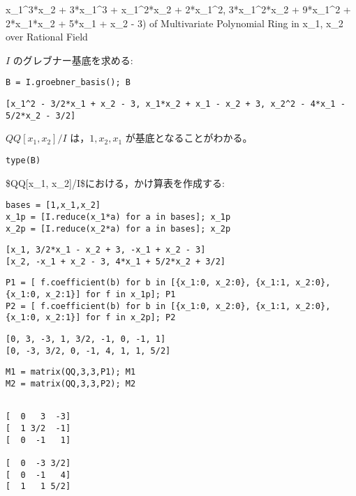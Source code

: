 \documentclass[dvipdfmx,11pat]{jarticle}
\begin{document}
x\_1\^{}3*x\_2 + 3*x\_1\^{}3 + x\_1\^{}2*x\_2 + 2*x\_1\^{}2,
3*x\_1\^{}2*x\_2 + 9*x\_1\^{}2 + 2*x\_1*x\_2 + 5*x\_1 + x\_2 - 3)
of Multivariate Polynomial Ring in x\_1, x\_2 over Rational Field

\(I\)  のグレブナー基底を求める:

\begin{verbatim}
B = I.groebner_basis(); B
\end{verbatim}

\label{org82f874b}
\begin{verbatim}
[x_1^2 - 3/2*x_1 + x_2 - 3, x_1*x_2 + x_1 - x_2 + 3, x_2^2 - 4*x_1 - 5/2*x_2 - 3/2]
\end{verbatim}


\(QQ[x_1, x_2]/I\) は，\(1, x_2, x_1\) が基底となることがわかる。

\begin{verbatim}
type(B)
\end{verbatim}

\$QQ[x\_1, x\_2]/I\$における，かけ算表を作成する:

\begin{verbatim}
bases = [1,x_1,x_2]
x_1p = [I.reduce(x_1*a) for a in bases]; x_1p
x_2p = [I.reduce(x_2*a) for a in bases]; x_2p

\end{verbatim}

\label{org6e818e9}
\begin{verbatim}
[x_1, 3/2*x_1 - x_2 + 3, -x_1 + x_2 - 3]
[x_2, -x_1 + x_2 - 3, 4*x_1 + 5/2*x_2 + 3/2]
\end{verbatim}


\begin{verbatim}
P1 = [ f.coefficient(b) for b in [{x_1:0, x_2:0}, {x_1:1, x_2:0}, {x_1:0, x_2:1}] for f in x_1p]; P1
P2 = [ f.coefficient(b) for b in [{x_1:0, x_2:0}, {x_1:1, x_2:0}, {x_1:0, x_2:1}] for f in x_2p]; P2
\end{verbatim}


\label{org89df5ac}
\begin{verbatim}
[0, 3, -3, 1, 3/2, -1, 0, -1, 1]
[0, -3, 3/2, 0, -1, 4, 1, 1, 5/2]
\end{verbatim}


\begin{verbatim}
M1 = matrix(QQ,3,3,P1); M1
M2 = matrix(QQ,3,3,P2); M2

\end{verbatim}

\label{org7fc02d3}
\begin{verbatim}

[  0   3  -3]
[  1 3/2  -1]
[  0  -1   1]

[  0  -3 3/2]
[  0  -1   4]
[  1   1 5/2]
\end{verbatim}
\end{document}

